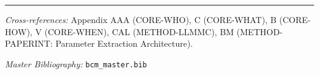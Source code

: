 \vspace{1em}
\hrule
\vspace{0.5em}

\noindent\textit{Cross-references:}
Appendix AAA (CORE-WHO), C (CORE-WHAT), B (CORE-HOW), V (CORE-WHEN),
CAL (METHOD-LLMMC), BM (METHOD-PAPERINT: Parameter Extraction Architecture).

\noindent\textit{Master Bibliography:} \texttt{bcm\_master.bib}

\nocite{bcm_master}

